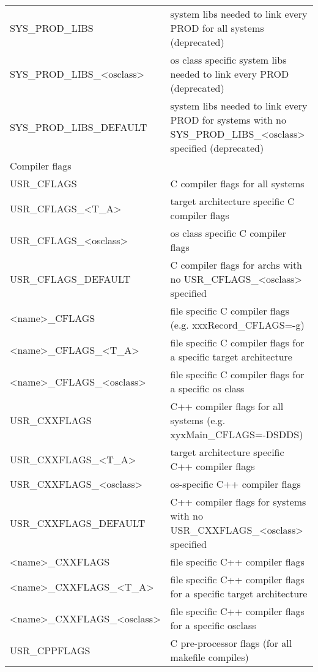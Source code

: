 \begin{center}
\begin{longtable}{p{2.94784in}p{3.76247in}}
SYS\_PROD\_LIBS & system libs needed to link every PROD for all systems (deprecated)\\
SYS\_PROD\_LIBS\_\textless{}osclass\textgreater{} & os class specific system libs needed to link every PROD (deprecated)\\
SYS\_PROD\_LIBS\_DEFAULT & system libs needed to link every PROD for systems with no SYS\_PROD\_LIBS\_\textless{}osclass\textgreater{} specified (deprecated)\\
Compiler flags & \\
USR\_CFLAGS & C compiler flags for all systems\\
USR\_CFLAGS\_\textless{}T\_A\textgreater{} & target architecture specific C compiler flags\\
USR\_CFLAGS\_\textless{}osclass\textgreater{} & os class specific C compiler flags\\
USR\_CFLAGS\_DEFAULT & C compiler flags for archs with no USR\_CFLAGS\_\textless{}osclass\textgreater{} specified\\
\textless{}name\textgreater{}\_CFLAGS & file specific C compiler flags (e.g. xxxRecord\_CFLAGS=-g)\\
\textless{}name\textgreater{}\_CFLAGS\_\textless{}T\_A\textgreater{} & file specific C compiler flags for a specific target architecture\\
\textless{}name\textgreater{}\_CFLAGS\_\textless{}osclass\textgreater{} & file specific C compiler flags for a specific os class\\
USR\_CXXFLAGS & C++ compiler flags for all systems (e.g. xyxMain\_CFLAGS=-DSDDS)\\
USR\_CXXFLAGS\_\textless{}T\_A\textgreater{} & target architecture specific C++ compiler flags\\
USR\_CXXFLAGS\_\textless{}osclass\textgreater{} & os-specific C++ compiler flags\\
USR\_CXXFLAGS\_DEFAULT & C++ compiler flags for systems with no USR\_CXXFLAGS\_\textless{}osclass\textgreater{} specified\\
\textless{}name\textgreater{}\_CXXFLAGS & file specific C++ compiler flags\\
\textless{}name\textgreater{}\_CXXFLAGS\_\textless{}T\_A\textgreater{} & file specific C++ compiler flags for a specific target architecture\\
\textless{}name\textgreater{}\_CXXFLAGS\_\textless{}osclass\textgreater{} & file specific C++ compiler flags for a specific osclass\\
USR\_CPPFLAGS & C pre-processor flags (for all makefile compiles)\\

\end{longtable}
\end{center}
